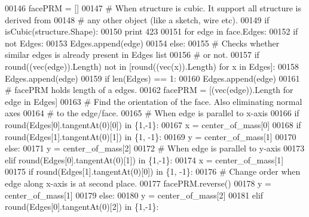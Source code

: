 \begin{DoxyCode}
00146     facePRM = []
00147     \textcolor{comment}{# When structure is cubic. It support all structure is derived from}
00148     \textcolor{comment}{# any other object (like a sketch, wire etc).}
00149     \textcolor{keywordflow}{if} isCubic(structure.Shape):
00150         \textcolor{keywordflow}{print} 423
00151         \textcolor{keywordflow}{for} edge \textcolor{keywordflow}{in} face.Edges:
00152             \textcolor{keywordflow}{if} \textcolor{keywordflow}{not} Edges:
00153                 Edges.append(edge)
00154             \textcolor{keywordflow}{else}:
00155                 \textcolor{comment}{# Checks whether similar edges is already present in Edges list}
00156                 \textcolor{comment}{# or not.}
00157                 \textcolor{keywordflow}{if} round((vec(edge)).Length) \textcolor{keywordflow}{not} \textcolor{keywordflow}{in} [round((vec(x)).Length) \textcolor{keywordflow}{for} x \textcolor{keywordflow}{in} Edges]:
00158                     Edges.append(edge)
00159         \textcolor{keywordflow}{if} len(Edges) == 1:
00160             Edges.append(edge)
00161         \textcolor{comment}{# facePRM holds length of a edges.}
00162         facePRM = [(vec(edge)).Length \textcolor{keywordflow}{for} edge \textcolor{keywordflow}{in} Edges]
00163         \textcolor{comment}{# Find the orientation of the face. Also eliminating normal axes}
00164         \textcolor{comment}{# to the edge/face.}
00165         \textcolor{comment}{# When edge is parallel to x-axis}
00166         \textcolor{keywordflow}{if} round(Edges[0].tangentAt(0)[0]) \textcolor{keywordflow}{in} \{1,-1\}:
00167             x = center\_of\_mass[0]
00168             \textcolor{keywordflow}{if} round(Edges[1].tangentAt(0)[1]) \textcolor{keywordflow}{in} \{1, -1\}:
00169                 y = center\_of\_mass[1]
00170             \textcolor{keywordflow}{else}:
00171                 y = center\_of\_mass[2]
00172         \textcolor{comment}{# When edge is parallel to y-axis}
00173         \textcolor{keywordflow}{elif} round(Edges[0].tangentAt(0)[1]) \textcolor{keywordflow}{in} \{1,-1\}:
00174             x = center\_of\_mass[1]
00175             \textcolor{keywordflow}{if} round(Edges[1].tangentAt(0)[0]) \textcolor{keywordflow}{in} \{1, -1\}:
00176                 \textcolor{comment}{# Change order when edge along x-axis is at second place.}
00177                 facePRM.reverse()
00178                 y = center\_of\_mass[1]
00179             \textcolor{keywordflow}{else}:
00180                 y = center\_of\_mass[2]
00181         \textcolor{keywordflow}{elif} round(Edges[0].tangentAt(0)[2]) \textcolor{keywordflow}{in} \{1,-1\}:

\end{DoxyCode}
